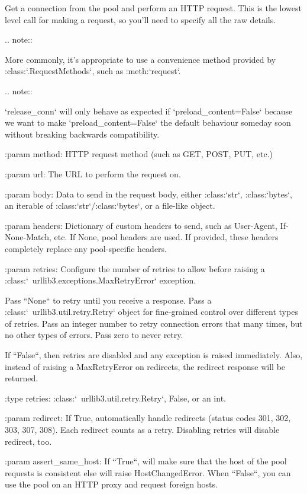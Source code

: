 \begin{DoxyVerb}Get a connection from the pool and perform an HTTP request. This is the
lowest level call for making a request, so you'll need to specify all
the raw details.

.. note::

   More commonly, it's appropriate to use a convenience method provided
   by :class:`.RequestMethods`, such as :meth:`request`.

.. note::

   `release_conn` will only behave as expected if
   `preload_content=False` because we want to make
   `preload_content=False` the default behaviour someday soon without
   breaking backwards compatibility.

:param method:
    HTTP request method (such as GET, POST, PUT, etc.)

:param url:
    The URL to perform the request on.

:param body:
    Data to send in the request body, either :class:`str`, :class:`bytes`,
    an iterable of :class:`str`/:class:`bytes`, or a file-like object.

:param headers:
    Dictionary of custom headers to send, such as User-Agent,
    If-None-Match, etc. If None, pool headers are used. If provided,
    these headers completely replace any pool-specific headers.

:param retries:
    Configure the number of retries to allow before raising a
    :class:`~urllib3.exceptions.MaxRetryError` exception.

    Pass ``None`` to retry until you receive a response. Pass a
    :class:`~urllib3.util.retry.Retry` object for fine-grained control
    over different types of retries.
    Pass an integer number to retry connection errors that many times,
    but no other types of errors. Pass zero to never retry.

    If ``False``, then retries are disabled and any exception is raised
    immediately. Also, instead of raising a MaxRetryError on redirects,
    the redirect response will be returned.

:type retries: :class:`~urllib3.util.retry.Retry`, False, or an int.

:param redirect:
    If True, automatically handle redirects (status codes 301, 302,
    303, 307, 308). Each redirect counts as a retry. Disabling retries
    will disable redirect, too.

:param assert_same_host:
    If ``True``, will make sure that the host of the pool requests is
    consistent else will raise HostChangedError. When ``False``, you can
    use the pool on an HTTP proxy and request foreign hosts.


\end{DoxyVerb}
